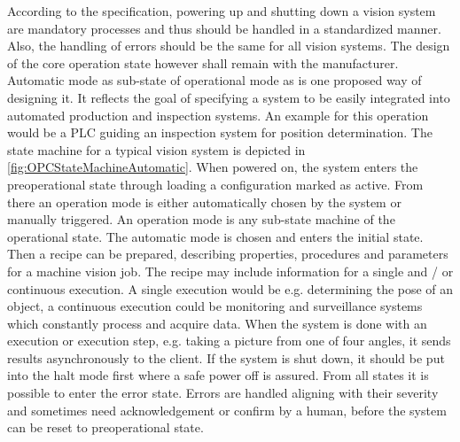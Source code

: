 According to the specification, powering up and shutting down a vision system are mandatory processes and thus should be handled in a standardized manner. Also, the handling of errors should be the same for all vision systems. The design of the core operation state however shall remain with the manufacturer. Automatic mode as sub-state of operational mode as   is one proposed way of designing it. It reflects the goal of specifying a system to be easily integrated into automated production and inspection systems. An example for this operation would be a PLC guiding an inspection system for position determination. The state machine for a typical vision system is depicted in \ref{fig:OPCStateMachineAutomatic}. When powered on, the system enters the preoperational state through loading a configuration marked as active. From there an operation mode is either automatically chosen by the system or manually triggered. An operation mode is any sub-state machine of the operational state. The automatic mode is chosen and enters the initial state. Then a recipe can be prepared, describing properties, procedures and parameters for a machine vision job. The recipe may include information for a single and / or continuous execution. A single execution would be e.g. determining the pose of an object, a continuous execution could be monitoring and surveillance systems which constantly process and acquire data. When the system is done with an execution or execution step, e.g. taking a picture from one of four angles, it sends results asynchronously to the client. If the system is shut down, it should be put into the halt mode first where a safe power off is assured. From all states it is possible to enter the error state. Errors are handled aligning with their severity and sometimes need acknowledgement or confirm by a human, before the system can be reset to preoperational state.\\

